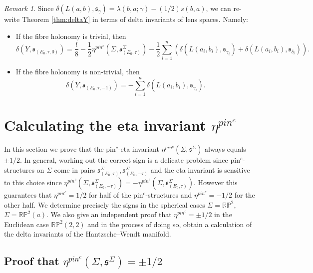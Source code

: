 \documentclass{amsart}
\theoremstyle{definition}
\theoremstyle{remark}
\newtheorem{remark}[theorem]{Remark}
\numberwithin{equation}{section}
\begin{document}
\begin{remark}
Since $\delta( L(a,b) , \mathfrak{s}_{\gamma} ) = \lambda(b,a;\gamma) - (1/2)s(b,a)$, we can re-write Theorem \ref{thm:deltaY} in terms of delta invariants of lens spaces. Namely:
\begin{itemize}
\item[(1)]{If the fibre holonomy is trivial, then
\[
\delta(Y,\mathfrak{s}_{(E_0 , \tau , 0)}) =  \frac{l}{8} - \frac{1}{2} \eta^{pin^c}(\Sigma , \mathfrak{s}_{(E_0 , \tau)}^{\Sigma}) -\frac{1}{2} \sum_{i=1}^n \left( \delta(L(a_i,b_i) , \mathfrak{s}_{\gamma_i}) + \delta( L(a_i,b_i) , \mathfrak{s}_{\delta_i}) \right).
\]
}
\item[(2)]{If the fibre holonomy is non-trivial, then
\[
\delta(Y , \mathfrak{s}_{(E_0 , \tau , -1)}) = -\sum_{i=1}^{n} \delta( L(a_i , b_i ) , \mathfrak{s}_{\gamma_i}).
\]
}
\end{itemize}

\end{remark}






\section{Calculating the eta invariant $\eta^{pin^c}$}\label{sec:epc}

In this section we prove that the pin$^c$-eta invariant $\eta^{pin^c}(\Sigma , \mathfrak{s}^{\Sigma})$ always equals $\pm 1/2$. In general, working out the correct sign is a delicate problem since pin$^c$-structures on $\Sigma$ come in pairs $\mathfrak{s}_{(E_0 , \tau)}^\Sigma, \mathfrak{s}_{(E_0 , -\tau)}^\Sigma$ and the eta invariant is sensitive to this choice since $\eta^{pin^c}(\Sigma , \mathfrak{s}_{(E_0 , -\tau)}^\Sigma) = -\eta^{pin^c}(\Sigma , \mathfrak{s}_{(E_0 , \tau)}^\Sigma)$. However this guarantees that $\eta^{pin^c} = 1/2$ for half of the pin$^c$-structures and $\eta^{pin^c} = -1/2$ for the other half. We determine precisely the signs in the spherical cases $\Sigma = \mathbb{RP}^2$, $\Sigma = \mathbb{RP}^2(a)$. We also give an independent proof that $\eta^{pin^c} = \pm 1/2$ in the Euclidean case $\mathbb{RP}^2(2,2)$ and in the process of doing so, obtain a calculation of the delta invariants of the Hantzsche--Wendt manifold.

\subsection{Proof that $\eta^{pin^c}(\Sigma , \mathfrak{s}^\Sigma) = \pm 1/2$}
\end{document}
